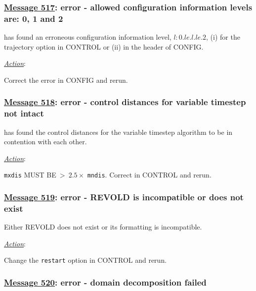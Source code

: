 %
%
%

\subsubsection*{\underline{Message 517}: error - allowed configuration information levels are: 0, 1 and 2}

\D has found an erroneous configuration information level, $l: 0 .le. l .le. 2$,
(i) for the trajectory option in CONTROL or (ii) in the header of CONFIG.

\noindent \underline{\em Action}:

Correct the error in CONFIG and rerun.

\subsubsection*{\underline{Message 518}: error - control distances for variable timestep not intact}

\D has found the control distances for the variable timestep
algorithm to be in contention with each other.

\noindent \underline{\em Action}:

{\tt mxdis} MUST BE$~>~2.5 \times$ {\tt mndis}.  Correct in
CONTROL and rerun.

\subsubsection*{\underline{Message 519}: error - REVOLD is incompatible or does not exist}

Either REVOLD does not exist or its formatting is incompatible.

\noindent \underline{\em Action}:

Change the {\tt restart} option in CONTROL and rerun.

\subsubsection*{\underline{Message 520}: error - domain decomposition failed}

